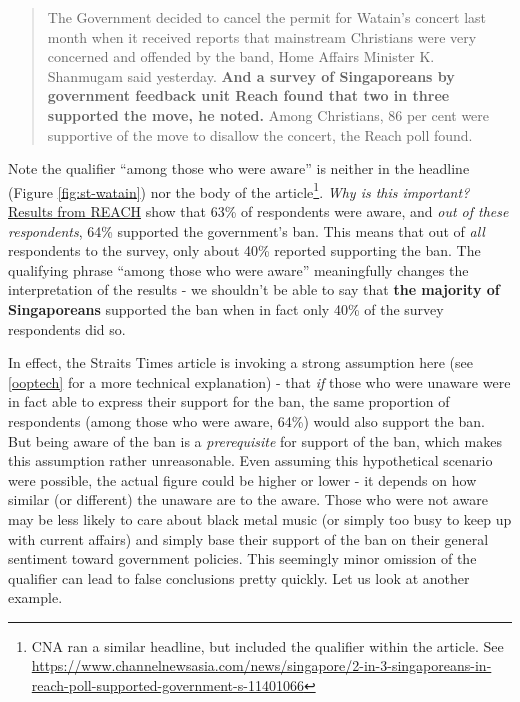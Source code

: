 \documentclass[openany]{book}
\let\rmarkdownfootnote\footnote%
\def\footnote{\protect\rmarkdownfootnote}
\begin{document}
\begin{quote}
The Government decided to cancel the permit for Watain's concert last
month when it received reports that mainstream Christians were very
concerned and offended by the band, Home Affairs Minister K. Shanmugam
said yesterday. \textbf{And a survey of Singaporeans by government
feedback unit Reach found that two in three supported the move, he
noted.} Among Christians, 86 per cent were supportive of the move to
disallow the concert, the Reach poll found.
\end{quote}

Note the qualifier ``among those who were aware'' is neither in the
headline (Figure \ref{fig:st-watain}) nor the body of the
article\footnote{CNA ran a similar headline, but included the qualifier
  within the article. See
  \url{https://www.channelnewsasia.com/news/singapore/2-in-3-singaporeans-in-reach-poll-supported-government-s-11401066}}.
\emph{Why is this important?}
\href{https://www.reach.gov.sg/~/media/2019/press-release/findings-of-poll-on-watain-concert--1-april-2019.pdf}{Results
from REACH} show that 63\% of respondents were aware, and \emph{out of
these respondents}, 64\% supported the government's ban. This means that
out of \emph{all} respondents to the survey, only about 40\% reported
supporting the ban. The qualifying phrase ``among those who were aware''
meaningfully changes the interpretation of the results - we shouldn't be
able to say that \textbf{the majority of Singaporeans} supported the ban
when in fact only 40\% of the survey respondents did so.

In effect, the Straits Times article is invoking a strong assumption
here (see \ref{ooptech} for a more technical explanation) - that
\emph{if} those who were unaware were in fact able to express their
support for the ban, the same proportion of respondents (among those who
were aware, 64\%) would also support the ban. But being aware of the ban
is a \emph{prerequisite} for support of the ban, which makes this
assumption rather unreasonable. Even assuming this hypothetical scenario
were possible, the actual figure could be higher or lower - it depends
on how similar (or different) the unaware are to the aware. Those who
were not aware may be less likely to care about black metal music (or
simply too busy to keep up with current affairs) and simply base their
support of the ban on their general sentiment toward government
policies. This seemingly minor omission of the qualifier can lead to
false conclusions pretty quickly. Let us look at another example.
\end{document}
